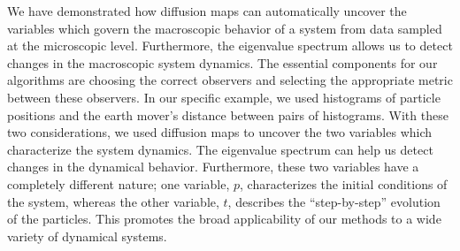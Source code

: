 \documentclass[prl, reprint, final, showkeys]{revtex4-1}
\begin{document}
We have demonstrated how diffusion maps can automatically uncover the variables which govern the macroscopic behavior of a system from data sampled at the microscopic level.
%
Furthermore, the eigenvalue spectrum allows us to detect changes in the macroscopic system dynamics.
%
The essential components for our algorithms are choosing the correct observers and selecting the appropriate metric between these observers.
%
In our specific example, we used histograms of particle positions and the earth mover's distance between pairs of histograms.
%
With these two considerations, we used diffusion maps to uncover the two variables which characterize the system dynamics.
%
The eigenvalue spectrum can help us detect changes in the dynamical behavior.
%
Furthermore, these two variables have a completely different nature;
one variable, $p$, characterizes the initial conditions of the system, whereas the other variable, $t$, describes the ``step-by-step'' evolution of the particles. 
%
This promotes the broad applicability of our methods to a wide variety of dynamical systems. 





\end{document}
